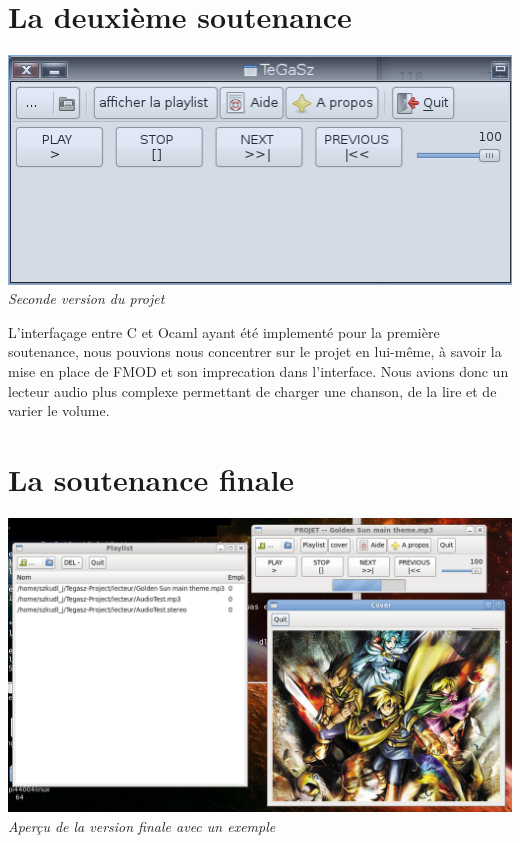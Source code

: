 \documentclass[12pt,a4paper]{report}
\begin{document}
\section{La deuxième soutenance}

\begin{center}
\includegraphics[scale = 0.8]{interface2.png}
\it{Seconde version du projet}
\end{center}


L'interfaçage entre C et Ocaml ayant été implementé pour la première soutenance,  nous pouvions nous concentrer sur le projet en lui-même, à savoir la mise en place de FMOD et son imprecation dans l'interface.
Nous avions donc un lecteur audio plus complexe permettant de charger une chanson, de la lire et de varier le volume.

\section{La soutenance finale}

\begin{center}
\includegraphics[scale = 0.4]{interface3.png}
\it{Aperçu de la version finale avec un exemple}
\end{center}
\end{document}

